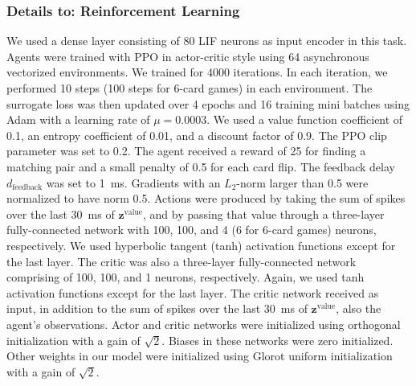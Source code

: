 \documentclass{article}
\newcommand{\vm}[1]{\bm{#1}}
\begin{document}
\subsubsection*{Details to: Reinforcement Learning}
We used a dense layer consisting of \num{80} \gls{LIF} neurons as input encoder in this task. Agents were trained with \gls{PPO} \cite{schulman2017proximal} in actor-critic style using \num{64} asynchronous vectorized environments. We trained for \num{4000} iterations. In each iteration, we performed \num{10} steps (\num{100} steps for 6-card games) in each environment. The surrogate loss was then updated over \num{4} epochs and \num{16} training mini batches using Adam \cite{kingma2014adam} with a learning rate of $\mu = 0.0003$. We used a value function coefficient of \num{0.1}, an entropy coefficient of \num{0.01}, and a discount factor of \num{0.9}. The \gls{PPO} clip parameter was set to \num{0.2}. The agent received a reward of \num{25} for finding a matching pair and a small penalty of \num{0.5} for each card flip. The feedback delay $d_{\mathrm{feedback}}$ was set to \SI{1}{ms}. Gradients with an $L_2$-norm larger than \num{0.5} were normalized to have norm \num{0.5}. Actions were produced by taking the sum of spikes over the last \SI{30}{ms} of $\vm{z}^\mathrm{value}$, and by passing that value through a three-layer fully-connected network with \num{100}, \num{100}, and \num{4} (\num{6} for 6-card games) neurons, respectively. We used hyperbolic tangent (tanh) activation functions except for the last layer. The critic was also a three-layer fully-connected network comprising of \num{100}, \num{100}, and \num{1} neurons, respectively. Again, we used tanh activation functions except for the last layer. The critic network received as input, in addition to the sum of spikes over the last \SI{30}{ms} of $\vm{z}^\mathrm{value}$, also the agent's observations. Actor and critic networks were initialized using orthogonal initialization \cite{saxe14exactsolutions} with a gain of $\sqrt{2}$. Biases in these networks were zero initialized. Other weights in our model were initialized using Glorot uniform initialization \cite{glorot2010understanding} with a gain of $\sqrt{2}$.
\end{document}
